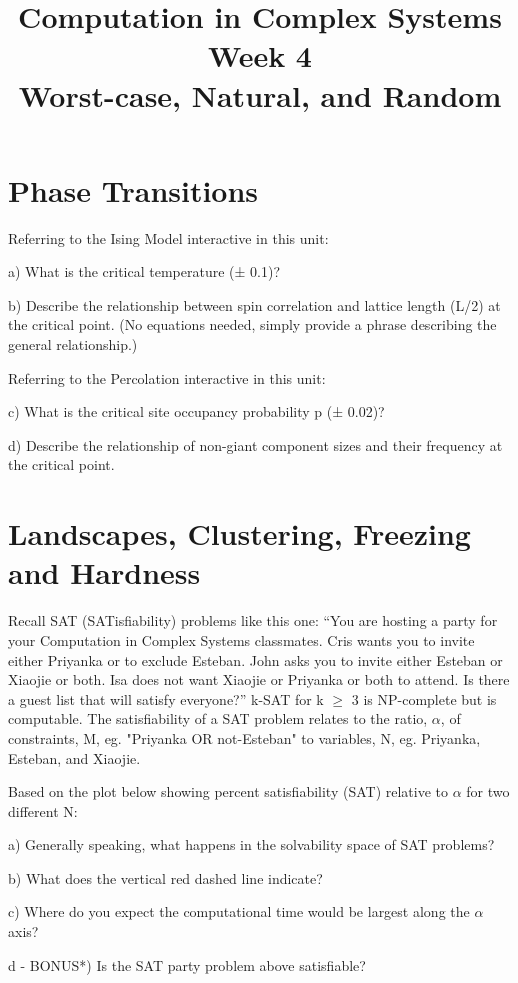 \documentclass[]{article}
\title{Computation in Complex Systems\\
	Week 4\\Worst-case, Natural, and Random
	}
\begin{document}
\maketitle

\section{Phase Transitions}

Referring to the Ising Model interactive in this unit:

a) What is the critical temperature (± 0.1)?

b) Describe the relationship between spin correlation and lattice length (L/2) at the critical point. (No equations needed, simply provide a phrase describing the general relationship.)

Referring to the Percolation interactive in this unit:

c) What is the critical site occupancy probability p (± 0.02)?

d) Describe the relationship of non-giant component sizes and their frequency at the critical point.


\section{Landscapes, Clustering, Freezing and Hardness}

Recall SAT (SATisfiability) problems like this one: “You are hosting a party for your Computation in Complex Systems classmates. Cris wants you to invite either Priyanka or to exclude Esteban. John asks you to invite either Esteban or Xiaojie or both. Isa does not want Xiaojie or Priyanka or both to attend. Is there a guest list that will satisfy everyone?”
k-SAT for k $\ge$ 3 is NP-complete but is computable. The satisfiability of a SAT problem relates to the ratio, $\alpha$, of constraints, M, eg. "Priyanka OR not-Esteban" to variables, N, eg. Priyanka, Esteban, and Xiaojie.

Based on the plot below showing percent satisfiability (SAT) relative to $\alpha$ for two different N:

a) Generally speaking, what happens in the solvability space of SAT problems?

b) What does the vertical red dashed line indicate?

c) Where do you expect the computational time would be largest along the $\alpha$ axis?

d - BONUS*) Is the SAT party problem above satisfiable?





\raggedright
{}

\end{document}
